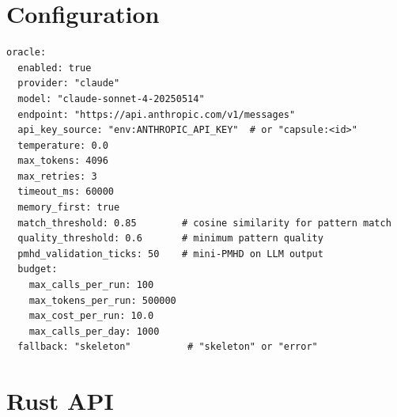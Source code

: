 \documentclass[11pt,a4paper,twoside]{article}
\theoremstyle{definition}
\theoremstyle{plain}
\theoremstyle{remark}
\begin{document}
\section{Configuration}\label{sec:config}

\begin{lstlisting}[title={Oracle Configuration}]
oracle:
  enabled: true
  provider: "claude"
  model: "claude-sonnet-4-20250514"
  endpoint: "https://api.anthropic.com/v1/messages"
  api_key_source: "env:ANTHROPIC_API_KEY"  # or "capsule:<id>"
  temperature: 0.0
  max_tokens: 4096
  max_retries: 3
  timeout_ms: 60000
  memory_first: true
  match_threshold: 0.85        # cosine similarity for pattern match
  quality_threshold: 0.6       # minimum pattern quality
  pmhd_validation_ticks: 50    # mini-PMHD on LLM output
  budget:
    max_calls_per_run: 100
    max_tokens_per_run: 500000
    max_cost_per_run: 10.0
    max_calls_per_day: 1000
  fallback: "skeleton"          # "skeleton" or "error"
\end{lstlisting}


\section{Rust API}\label{sec:api}
\end{document}
